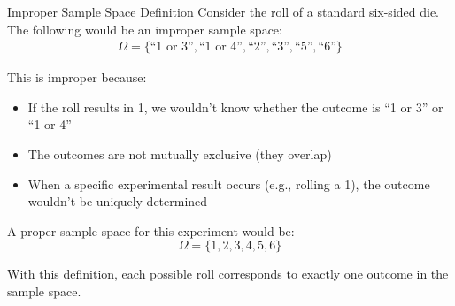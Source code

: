 \begin{exampleboxbreak}{Improper Sample Space Definition}
Consider the roll of a standard six-sided die. The following would be an improper sample space:
\begin{align*}
\Omega = \{\text{``1 or 3''}, \text{``1 or 4''}, \text{``2''}, \text{``3''}, \text{``5''}, \text{``6''}\}
\end{align*}

This is improper because:
\begin{itemize}
    \item If the roll results in 1, we wouldn't know whether the outcome is ``1 or 3'' or ``1 or 4''
    \item The outcomes are not mutually exclusive (they overlap)
    \item When a specific experimental result occurs (e.g., rolling a 1), the outcome wouldn't be uniquely determined
\end{itemize}

A proper sample space for this experiment would be:
\[ \Omega = \{1, 2, 3, 4, 5, 6\} \]

With this definition, each possible roll corresponds to exactly one outcome in the sample space.
\end{exampleboxbreak}
